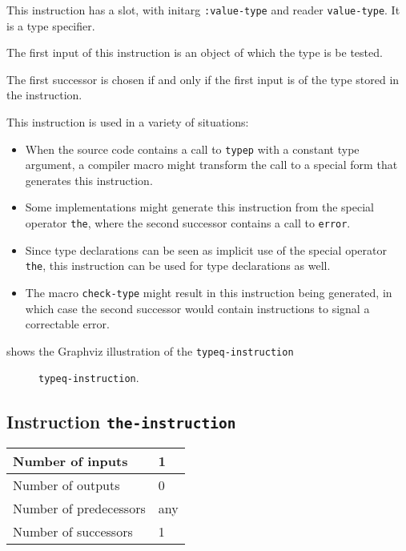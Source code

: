 This instruction has a slot, with initarg \texttt{:value-type} and
reader \texttt{value-type}. It is a \commonlisp{} type specifier.

The first input of this instruction is an object of which the type
is be tested.

The first successor is chosen if and only if the first input is of
the type stored in the instruction.

This instruction is used in a variety of situations:

\begin{itemize}
\item When the source code contains a call to \texttt{typep} with a
  constant type argument, a compiler macro might transform the call to
  a special form that generates this instruction.
\item Some implementations might generate this instruction from the
  special operator \texttt{the}, where the second successor contains a
  call to \texttt{error}.
\item Since type declarations can be seen as implicit use of the
  special operator \texttt{the}, this instruction can be used for type
  declarations as well.
\item The macro \texttt{check-type} might result in this instruction
  being generated, in which case the second successor would contain
  instructions to signal a correctable error.
\end{itemize}

 shows the Graphviz illustration of the
\texttt{typeq-instruction}

\begin{figure}
\begin{center}
\end{center}
\caption{\label{fig-typeq-instruction}
\texttt{typeq-instruction}.}
\end{figure}

\subsection{Instruction \texttt{the-instruction}}
\label{mir-instruction-the}

\begin{tabular}{|l|l|}
  \hline
  Number of inputs & 1\\
  \hline
  Number of outputs & 0\\
  \hline
  Number of predecessors & any\\
  \hline
  Number of successors & 1\\
  \hline
\end{tabular}

